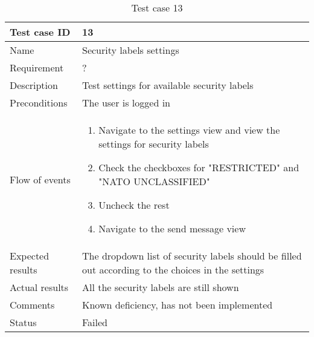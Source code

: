 		\begin{table}
			\begin{tabular}{l|p{10cm}}
				Test case ID & 13\\ \hline
				Name & Security labels settings\\ \hline
				Requirement & ?\\ \hline
				Description & Test settings for available security labels\\ \hline
				Preconditions & The user is logged in\\ \hline
				Flow of events & 
					\begin{enumerate}
						\item{}Navigate to the settings view and view the settings for security labels
						\item{}Check the checkboxes for "RESTRICTED" and "NATO UNCLASSIFIED"
						\item{}Uncheck the rest
						\item{}Navigate to the send message view
					\end{enumerate} \\ \hline
				Expected results & The dropdown list of security labels should be filled out according to the choices in the settings \\ \hline
				Actual results &All the security labels are still shown\\ \hline
				Comments & Known deficiency, has not been implemented\\ \hline
				Status &Failed\\ \hline
			\end{tabular}
			\caption{Test case 13} \label{tab:case13}
		\end{table}

